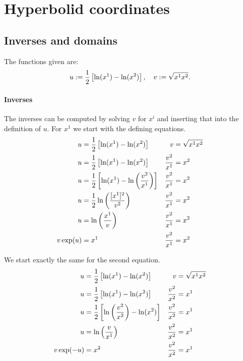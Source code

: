 \documentclass[11pt, english, fleqn, DIV=15, headinclude, BCOR=1cm]{scrartcl}
\begin{document}
\section{Hyperbolid coordinates}
\label{homework:3}

\subsection{Inverses and domains}

The functions given are:
\[
    u := \frac12 \left[ \ln(x^1) - \ln(x^2) \right]
    ,\quad
    v := \sqrt{x^1 x^2}.
\]

\paragraph{Inverses}

The inverses can be computed by solving $v$ for $x^i$ and inserting that into
the definition of $u$. For $x^1$ we start with the defining equations.
\begin{align*}
    u &= \frac12 \left[ \ln(x^1) - \ln(x^2) \right]
    &
    v &= \sqrt{x^1 x^2} \\
    u &= \frac12 \left[ \ln(x^1) - \ln(x^2) \right]
    &
    \frac{v^2}{x^1} &= x^2 \\
    u &= \frac12 \left[ \ln(x^1) - \ln\left( \frac{v^2}{x^1} \right) \right]
    &
    \frac{v^2}{x^1} &= x^2 \\
    u &= \frac12 \ln\left( \frac{[x^1]^2}{v^2} \right)
    &
    \frac{v^2}{x^1} &= x^2 \\
    u &= \ln\left( \frac{x^1}{v} \right)
    &
    \frac{v^2}{x^1} &= x^2 \\
    v \exp(u) &= x^1
    &
    \frac{v^2}{x^1} &= x^2
\end{align*}

We start exactly the same for the second equation.
\begin{align*}
    u &= \frac12 \left[ \ln(x^1) - \ln(x^2) \right]
    &
    v &= \sqrt{x^1 x^2} \\
    u &= \frac12 \left[ \ln(x^1) - \ln(x^2) \right]
    &
    \frac{v^2}{x^2} &= x^1 \\
    u &= \frac12 \left[ \ln\left( \frac{v^2}{x^2} \right) - \ln(x^2) \right]
    &
    \frac{v^2}{x^2} &= x^1 \\
    u &= \ln\left( \frac{v}{x^1} \right)
    &
    \frac{v^2}{x^2} &= x^1 \\
    v \exp(-u) &= x^2
    &
    \frac{v^2}{x^2} &= x^1
\end{align*}
\end{document}
